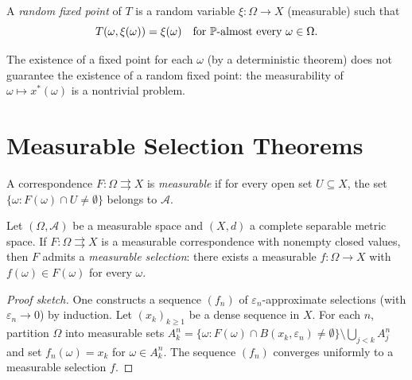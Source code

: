 \begin{definition}
A \emph{random fixed point} of $T$ is a random variable $\xi\colon \Omega \to X$
(measurable) such that
\[
  T(\omega, \xi(\omega)) = \xi(\omega) \quad \text{for } \mathbb{P}\text{-almost every }
  \omega \in \Omega.
\]
\end{definition}

\begin{remark}
The existence of a fixed point for each $\omega$ (by a deterministic theorem) does not
guarantee the existence of a random fixed point: the measurability of
$\omega \mapsto x^*(\omega)$ is a nontrivial problem.
\end{remark}

\section{Measurable Selection Theorems}

\begin{definition}
A correspondence $F\colon \Omega \rightrightarrows X$ is \emph{measurable} if for every
open set $U \subseteq X$, the set $\{\omega : F(\omega) \cap U \neq \emptyset\}$ belongs
to $\mathcal{A}$.
\end{definition}

\begin{theorem}
\label{thm:measurable-selection}
Let $(\Omega, \mathcal{A})$ be a measurable space and $(X, d)$ a complete separable metric
space. If $F\colon \Omega \rightrightarrows X$ is a measurable correspondence with nonempty
closed values, then $F$ admits a \emph{measurable selection}: there exists a measurable
$f\colon \Omega \to X$ with $f(\omega) \in F(\omega)$ for every $\omega$.
\end{theorem}

\begin{proof}[Proof sketch]
One constructs a sequence $(f_n)$ of $\varepsilon_n$-approximate selections (with
$\varepsilon_n \to 0$) by induction. Let $(x_k)_{k \geq 1}$ be a dense sequence in $X$.
For each $n$, partition $\Omega$ into measurable sets
$A_k^n = \{\omega : F(\omega) \cap B(x_k, \varepsilon_n) \neq \emptyset\} \setminus
\bigcup_{j<k} A_j^n$ and set $f_n(\omega) = x_k$ for $\omega \in A_k^n$. The sequence
$(f_n)$ converges uniformly to a measurable selection $f$.
\end{proof}

